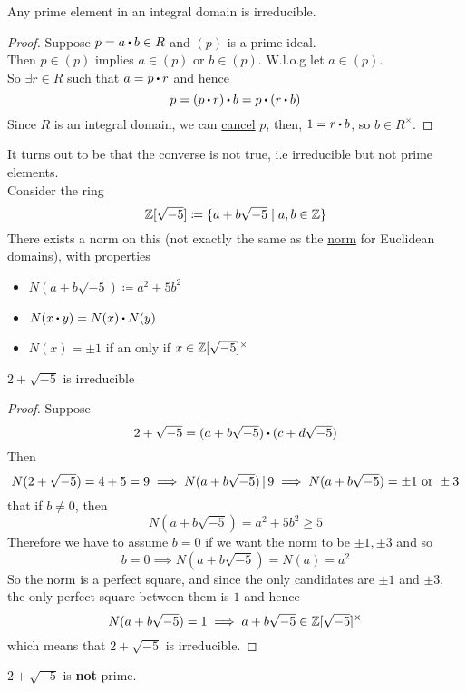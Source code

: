 \documentclass[../Main.tex]{subfiles}
\begin{document}
\begin{prop}[title = Prime elements in integral domain are irreducible,label=11.2]
	Any prime element in an integral domain is irreducible.
\end{prop}
\begin{proof}
	Suppose $p=a\rdot b\in R$ and $(p)$ is a prime ideal.\\
	Then $p\in (p)$ implies $a\in (p)$ or $b\in (p)$. W.l.o.g let $a\in (p)$.\\
	So $\exists r\in R$ such that $a=p\rdot r$ and hence
	\[p=(p\rdot r)\rdot b=p\rdot (r\rdot b)\]
	Since $R$ is an integral domain, we can \hyperref[prop:cancel]{cancel} $p$, then, $1=r\rdot b$, so $b\in R^\times $.
\end{proof}
\begin{example}
	It turns out to be that the converse is not true, i.e irreducible but not prime elements.\\
	Consider the ring 
	\[\mathbb{Z}[\sqrt{-5}] \coloneq \{a+b\sqrt{-5}\mid a,b\in \mathbb{Z}\} \]
	There exists a norm on this (not exactly the same as the \hyperref[dfn:norm]{norm} for Euclidean domains), with properties
	\begin{itemize}
		\item $N(a+b\sqrt{-5}) \coloneqq a^2+5b^2$
		\item $N(x\rdot y)=N(x)\rdot N(y)$
		\item $N(x)=\pm 1$ if an only if $x\in \mathbb{Z}[\sqrt{-5}]^\times$
	\end{itemize}
\end{example}
\begin{claim}
	$2+\sqrt{-5}$ is irreducible
\end{claim}
\begin{proof}
	Suppose 
	\[2+\sqrt{-5}=(a+b\sqrt{-5})\rdot (c+d\sqrt{-5})\]
	Then
	\[N(2+\sqrt{-5}) = 4+5 =9 \implies N(a+b\sqrt{-5}) \, | \, 9 \implies N(a+b\sqrt{-5}) = \pm 1 \text{ or } \pm 3\]
	\Obs that if $b\ne 0$, then \[N(a+b\sqrt{-5}) = a^2+5b^2\ge 5\]
	Therefore we have to assume $b=0$ if we want the norm to be $\pm 1, \pm 3$ and so
	\[b=0\implies N(a+b\sqrt{-5})=N(a)=a^2\]
	So the norm is a perfect square, and since the only candidates are $\pm 1$ and $\pm 3$, the only perfect square between them is $1$ and hence
	\[N(a+b\sqrt{-5})=1 \implies a+b\sqrt{-5}\in \mathbb{Z}[\sqrt{-5}]^\times\]
	which means that $2+\sqrt{-5}$ is irreducible.
\end{proof}
\begin{claim}
	$2+\sqrt{-5}$ is \textbf{not} prime.
\end{claim}
\end{document}

